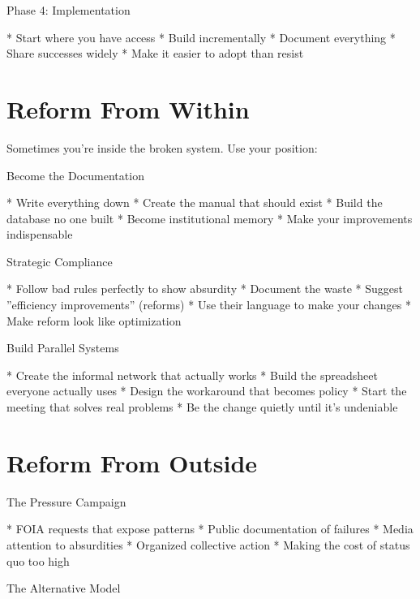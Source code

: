 \documentclass[12pt,oneside]{book}
\begin{document}
                Phase 4: Implementation

                    * Start where you have access
                    * Build incrementally
                    * Document everything
                    * Share successes widely
                    * Make it easier to adopt than resist

\section{Reform From Within}

Sometimes you're inside the broken system. Use your position:

                Become the Documentation

                    * Write everything down
                    * Create the manual that should exist
                    * Build the database no one built
                    * Become institutional memory
                    * Make your improvements indispensable

                Strategic Compliance

                    * Follow bad rules perfectly to show absurdity
                    * Document the waste
                    * Suggest ''efficiency improvements'' (reforms)
                    * Use their language to make your changes
                    * Make reform look like optimization

                Build Parallel Systems

                    * Create the informal network that actually works
                    * Build the spreadsheet everyone actually uses
                    * Design the workaround that becomes policy
                    * Start the meeting that solves real problems
                    * Be the change quietly until it's undeniable

\section{Reform From Outside}

                The Pressure Campaign

                    * FOIA requests that expose patterns
                    * Public documentation of failures
                    * Media attention to absurdities
                    * Organized collective action
                    * Making the cost of status quo too high

                The Alternative Model
\end{document}
